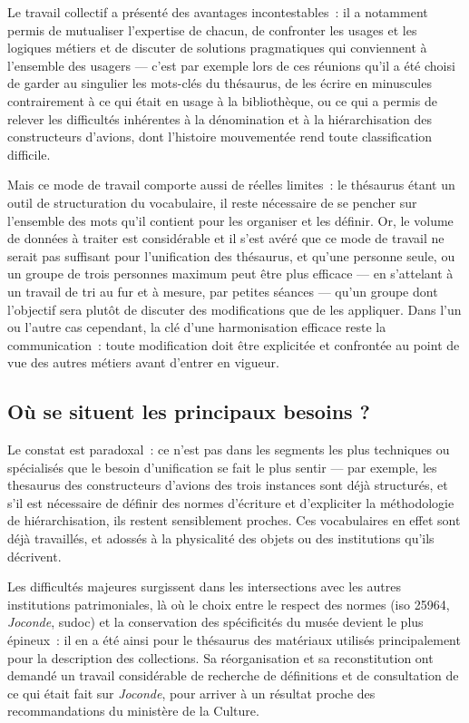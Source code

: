 Le travail collectif a présenté des avantages incontestables~: il a notamment permis de mutualiser l'expertise de chacun, de confronter les usages et les logiques métiers et de discuter de solutions pragmatiques qui conviennent à l'ensemble des usagers --- c'est par exemple lors de ces réunions qu'il a été choisi de garder au singulier les mots-clés du thésaurus, de les écrire en minuscules contrairement à ce qui était en usage à la bibliothèque, ou ce qui a permis de relever les difficultés inhérentes à la dénomination et à la hiérarchisation des constructeurs d'avions, dont l'histoire mouvementée rend toute classification difficile.

Mais ce mode de travail comporte aussi de réelles limites~: le thésaurus étant un outil de structuration du vocabulaire, il reste nécessaire de se pencher sur l'ensemble des mots qu'il contient pour les organiser et les définir. Or, le volume de données à traiter est considérable et il s'est avéré que ce mode de travail ne serait pas suffisant pour l'unification des thésaurus, et qu'une personne seule, ou un groupe de trois personnes maximum peut être plus efficace --- en s'attelant à un travail de tri au fur et à mesure, par petites séances --- qu'un groupe dont l'objectif sera plutôt de discuter des modifications que de les appliquer. Dans l'un ou l'autre cas cependant, la clé d'une harmonisation efficace reste la communication~: toute modification doit être explicitée et confrontée au point de vue des autres métiers avant d'entrer en vigueur.


\subsection{Où se situent les principaux besoins ?}

Le constat est paradoxal~: ce n’est pas dans les segments les plus techniques ou spécialisés que le besoin d’unification se fait le plus sentir --- par exemple, les \gls{thesaurus} des constructeurs d'avions des trois instances sont déjà structurés, et s'il est nécessaire de définir des normes d'écriture et d'expliciter la méthodologie de hiérarchisation, ils restent sensiblement proches. Ces vocabulaires en effet sont déjà travaillés, et adossés à la physicalité des objets ou des institutions qu'ils décrivent. 

Les difficultés majeures surgissent dans les intersections avec les autres institutions patrimoniales, là où le choix entre le respect des normes (\gls{iso} 25964, \textit{Joconde}, \ac{sudoc}) et la conservation des spécificités du musée devient le plus épineux~: il en a été ainsi pour le thésaurus des matériaux utilisés principalement pour la description des collections. Sa réorganisation et sa reconstitution ont demandé un travail considérable de recherche de définitions et de consultation de ce qui était fait sur \textit{Joconde}, pour arriver à un résultat proche des recommandations du ministère de la Culture.